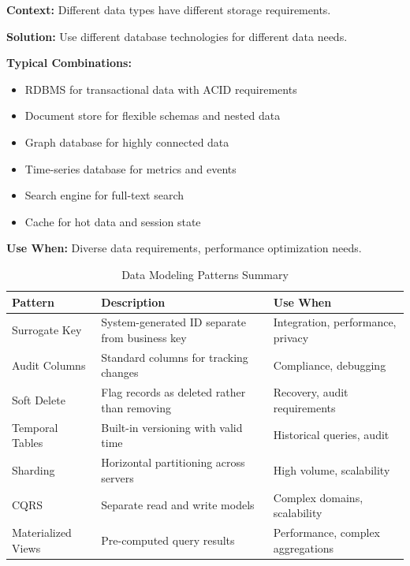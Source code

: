 \documentclass[11pt,letterpaper]{article}
\begin{document}
\begin{patternbox}
\textbf{Context:} Different data types have different storage requirements.

\textbf{Solution:} Use different database technologies for different data needs.

\textbf{Typical Combinations:}
\begin{itemize}[nosep]
    \item RDBMS for transactional data with ACID requirements
    \item Document store for flexible schemas and nested data
    \item Graph database for highly connected data
    \item Time-series database for metrics and events
    \item Search engine for full-text search
    \item Cache for hot data and session state
\end{itemize}

\textbf{Use When:} Diverse data requirements, performance optimization needs.
\end{patternbox}

\begin{table}[H]
\centering
\caption{Data Modeling Patterns Summary}
\small
\begin{tabular}{@{}L{3cm}L{4.5cm}L{5.5cm}@{}}
\toprule
\textbf{Pattern} & \textbf{Description} & \textbf{Use When} \\
\midrule
Surrogate Key & System-generated ID separate from business key & Integration, performance, privacy \\
\addlinespace
Audit Columns & Standard columns for tracking changes & Compliance, debugging \\
\addlinespace
Soft Delete & Flag records as deleted rather than removing & Recovery, audit requirements \\
\addlinespace
Temporal Tables & Built-in versioning with valid time & Historical queries, audit \\
\addlinespace
Sharding & Horizontal partitioning across servers & High volume, scalability \\
\addlinespace
CQRS & Separate read and write models & Complex domains, scalability \\
\addlinespace
Materialized Views & Pre-computed query results & Performance, complex aggregations \\
\bottomrule
\end{tabular}
\end{table}
\end{document}
